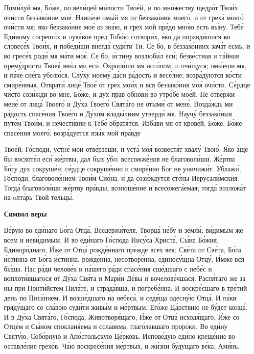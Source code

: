    Поми́луй мя, Бо́же, по вели́цей ми́лости Твое́й, и по мно́жеству щедро́т
Твои́х очи́сти беззако́ние мое́. Наипа́че омы́й мя от беззако́ния моего́, и от
греха́ моего́ очи́сти мя; яко беззако́ние мое́ аз зна́ю, и грех мой пре́до мно́ю
есть вы́ну. Тебе́ Еди́ному согреши́х и лука́вое пред Тобо́ю сотвори́х, я́ко да
оправди́шися во словесе́х Твои́х, и победи́ши внегда́ суди́ти Ти. Се бо, в
беззако́ниих зача́т есмь, и во гресе́х роди́ мя ма́ти моя́. Се бо, и́стину
возлюби́л еси́; безве́стная и та́йная прему́дрости Твоея́ яви́л ми еси́.
Окропи́ши мя иссо́пом, и очи́щуся; омы́еши мя, и па́че сне́га убелю́ся. Слу́ху
моему́ да́си ра́дость и весе́лие; возра́дуются ко́сти смире́нныя. Отврати́ лице́
Твое́ от грех мои́х и вся беззако́ния моя́ очи́сти. Се́рдце чи́сто сози́жди во
мне, Бо́же, и дух прав обнови́ во утро́бе мое́й. Не отве́ржи мене́ от
лица́ Твоего́ и Ду́ха Твоего́ Свята́го не отыми́ от мене́. Возда́ждь ми
ра́дость спасе́ния Твое́го и Ду́хом влады́чним утверди́ мя. Научу́
беззако́ныя путе́м Твои́м, и нечести́вии к Тебе́ обратя́тся. Изба́ви мя от
крове́й, Бо́же, Бо́же спасе́ния моего́; возра́дуется язы́к мой пра́вде

Твое́й. Го́споди, устне́ мои отве́рзеши, и уста́ моя́ возвестя́т хвалу́
Твою́. Я́ко а́ще бы восхоте́л еси́ же́ртвы, дал бых у́бо: всесожже́ния не
благоволи́ши. Же́ртва Бо́гу дух сокруше́н; се́рдце сокруше́нно и смире́нно
Бог не уничижи́т. Ублажи́, Го́споди, благоволе́нием Твои́м Сио́на, и
да сози́ждутся сте́ны Иерусали́мския. Тогда́ благоволи́ши же́ртву
пра́вды, возноше́ние и всесожега́емая; тогда́ возложа́т на oлта́рь Твой
тельцы́.



 

\bfseries Символ веры\normalfont{}


   Ве́рую во еди́наго Бо́га Отца́, Вседержи́теля, Творца́ не́бу и земли́,
ви́димым же всем и неви́димым. И во еди́наго Го́спода Иису́са Христа́, Сы́на
Бо́жия, Единоро́днаго, И́же от Отца́ рожде́ннаго пре́жде всех век; Све́та от
Све́та, Бо́га и́стинна от Бо́га и́стинна, рожде́нна, несотворе́нна, единосу́щна
Отцу́, И́мже вся бы́ша. Нас ра́ди челове́к и на́шего ра́ди спасе́ния сше́дшаго с
небе́с и воплоти́вшагося от Ду́ха Свя́та и Мари́и Де́вы и вочелове́чшася.
Распя́таго же за ны при Понти́йстем Пила́те, и страда́вша, и погребе́нна. И
воскре́сшаго в тре́тий день по Писа́нием. И возше́дшаго на небеса́, и
седя́ща одесну́ю Отца́. И па́ки гряду́щаго со сла́вою суди́ти живы́м и
ме́ртвым, Его́же Ца́рствию не бу́дет конца́. И в Ду́ха Свята́го, Го́спода,
Животворя́щаго, И́же от Отца́ исходя́щаго, И́же со Отце́м и Сы́ном
спокланя́ема и ссла́вима, глаго́лавшаго проро́ки. Во еди́ну Святу́ю,
Собо́рную и Апо́стольскую Це́рковь. Испове́дую еди́но креще́ние во
оставле́ние грехо́в. Ча́ю воскресе́ния ме́ртвых, и жи́зни бу́дущаго ве́ка.
Ами́нь.



